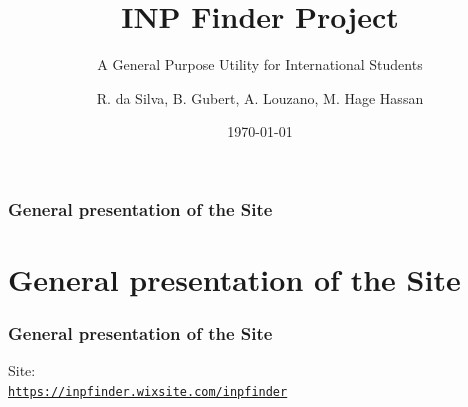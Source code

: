 \documentclass{beamer}
\title[INP Finder Project]{INP Finder Project}
\subtitle{A General Purpose Utility for International Students}
\author{R. da Silva, B. Gubert, A. Louzano, M. Hage Hassan} %
\institute[Phelma] %
{
Grenoble Institute of Technology - Phelma\\ %
\medskip

}
\date{\today} %
\begin{document}
\begin{frame}
\titlepage %
\end{frame}


\begin{frame}
\frametitle{General presentation of the Site}

\tableofcontents

\end{frame}

\section{General presentation of the Site} %
\begin{frame}
\frametitle{General presentation of the Site}
Site: \\
\texttt{\textcolor{blue}{\url{https://inpfinder.wixsite.com/inpfinder}}}

\end{frame}
\end{document}
